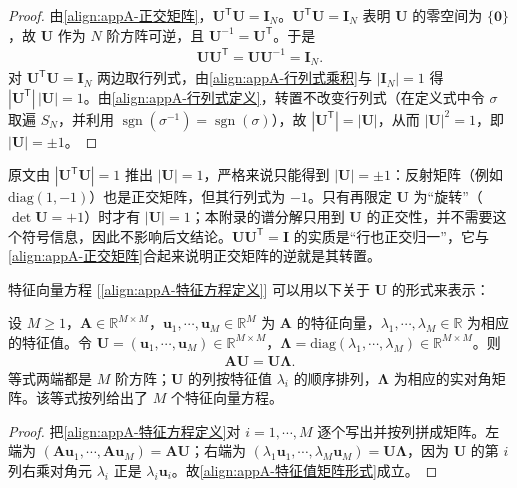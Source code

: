 \documentclass[../main.tex]{subfiles}
\begin{document}
\begin{proof}
由\eqref{align:appA-正交矩阵}，$\bm{U}^{\mathsf{T}}\bm{U}=\bm{I}_{N}$。$\bm{U}^{\mathsf{T}}\bm{U}=\bm{I}_{N}$ 表明 $\bm{U}$ 的零空间为 $\{\bm{0}\}$，故 $\bm{U}$ 作为 $N$ 阶方阵可逆，且 $\bm{U}^{-1}=\bm{U}^{\mathsf{T}}$。于是
\begin{align*}
 \bm{U}\bm{U}^{\mathsf{T}}=\bm{U}\bm{U}^{-1}=\bm{I}_{N}.
\end{align*}
对 $\bm{U}^{\mathsf{T}}\bm{U}=\bm{I}_{N}$ 两边取行列式，由\eqref{align:appA-行列式乘积}与 $|\bm{I}_{N}|=1$ 得 $|\bm{U}^{\mathsf{T}}|\,|\bm{U}|=1$。由\eqref{align:appA-行列式定义}，转置不改变行列式（在定义式中令 $\sigma$ 取遍 $S_N$，并利用 $\operatorname{sgn}(\sigma^{-1})=\operatorname{sgn}(\sigma)$），故 $|\bm{U}^{\mathsf{T}}|=|\bm{U}|$，从而 $|\bm{U}|^{2}=1$，即 $|\bm{U}|=\pm1$。
\end{proof}

\begin{remark}
原文由 $|\bm{U}^{\mathsf{T}}\bm{U}|=1$ 推出 $|\bm{U}|=1$，严格来说只能得到 $|\bm{U}|=\pm1$：反射矩阵（例如 $\mathrm{diag}(1,-1)$）也是正交矩阵，但其行列式为 $-1$。只有再限定 $\bm{U}$ 为“旋转”（$\det\bm{U}=+1$）时才有 $|\bm{U}|=1$；本附录的谱分解只用到 $\bm{U}$ 的正交性，并不需要这个符号信息，因此不影响后文结论。$\bm{U}\bm{U}^{\mathsf{T}}=\bm{I}$ 的实质是“行也正交归一”，它与\eqref{align:appA-正交矩阵}合起来说明正交矩阵的逆就是其转置。
\end{remark}

特征向量方程 [\eqref{align:appA-特征方程定义}] 可以用以下关于 $\bm{U}$ 的形式来表示：
\begin{proposition}[特征向量方程的矩阵形式]\label{proposition:appA-特征值分解矩阵形式}
设 $M\geqslant1$，$\bm{A}\in\mathbb{R}^{M\times M}$，$\bm{u}_1,\cdots,\bm{u}_M\in\mathbb{R}^{M}$ 为 $\bm{A}$ 的特征向量，$\lambda_1,\cdots,\lambda_M\in\mathbb{R}$ 为相应的特征值。令 $\bm{U}=(\bm{u}_1,\cdots,\bm{u}_M)\in\mathbb{R}^{M\times M}$，$\bm{\Lambda}=\mathrm{diag}(\lambda_1,\cdots,\lambda_M)\in\mathbb{R}^{M\times M}$。则
\begin{align}
  \bm{A}\bm{U}=\bm{U}\bm{\Lambda}.
  \label{align:appA-特征值矩阵形式}
\end{align}
等式两端都是 $M$ 阶方阵；$\bm{U}$ 的列按特征值 $\lambda_i$ 的顺序排列，$\bm{\Lambda}$ 为相应的实对角矩阵。该等式按列给出了 $M$ 个特征向量方程。
\end{proposition}

\begin{proof}
把\eqref{align:appA-特征方程定义}对 $i=1,\cdots,M$ 逐个写出并按列拼成矩阵。左端为 $(\bm{A}\bm{u}_1,\cdots,\bm{A}\bm{u}_M)=\bm{A}\bm{U}$；右端为 $(\lambda_1\bm{u}_1,\cdots,\lambda_M\bm{u}_M)=\bm{U}\bm{\Lambda}$，因为 $\bm{U}$ 的第 $i$ 列右乘对角元 $\lambda_i$ 正是 $\lambda_i\bm{u}_i$。故\eqref{align:appA-特征值矩阵形式}成立。
\end{proof}
\end{document}
